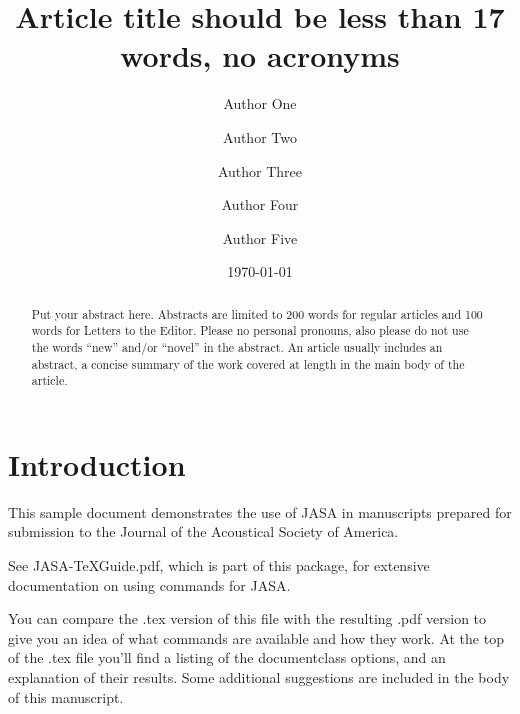 \documentclass[preprint]{JASA}
\begin{document}
\title[JASA/Sample JASA Article]{Article title should be less than 17 words, no acronyms}
\author{Author One}
\author{Author Two}
\author{Author Three}

\author{Author Four}
 
\author{Author Five}			


\date{\today} 


\begin{abstract}
Put your abstract here. Abstracts are limited to 200 words for
regular articles and 100 words for Letters to the Editor. Please no
personal pronouns, also please do not use the words ``new'' and/or
``novel'' in the abstract. An article usually includes an abstract, a
concise summary of the work covered at length in the main body of the
article.     
\end{abstract}



\maketitle




\section{\label{sec:1} Introduction}
This sample document demonstrates the use of JASA in manuscripts 
prepared for submission to the Journal of the Acoustical Society of America. 

See JASA-TeXGuide.pdf, which is part of this package, for extensive
documentation on using commands for JASA.

You can compare the .tex version of this file with the resulting .pdf
version to give you an idea of what commands are available and how
they work. At the top of the .tex file you'll find a listing of the
documentclass options, and an explanation of their results.
Some additional suggestions are included in the body of this
manuscript.  
\end{document}
